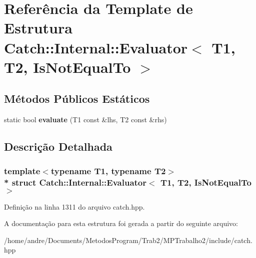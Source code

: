 \hypertarget{structCatch_1_1Internal_1_1Evaluator_3_01T1_00_01T2_00_01IsNotEqualTo_01_4}{}\section{Referência da Template de Estrutura Catch\+:\+:Internal\+:\+:Evaluator$<$ T1, T2, Is\+Not\+Equal\+To $>$}
\label{structCatch_1_1Internal_1_1Evaluator_3_01T1_00_01T2_00_01IsNotEqualTo_01_4}
\subsection*{Métodos Públicos Estáticos}
\begin{DoxyCompactItemize}
\item 
static bool {\bfseries evaluate} (T1 const \&lhs, T2 const \&rhs)\hypertarget{structCatch_1_1Internal_1_1Evaluator_3_01T1_00_01T2_00_01IsNotEqualTo_01_4_a956a12d0f4a7dceb5a1ce914421ff945}{}\label{structCatch_1_1Internal_1_1Evaluator_3_01T1_00_01T2_00_01IsNotEqualTo_01_4_a956a12d0f4a7dceb5a1ce914421ff945}

\end{DoxyCompactItemize}


\subsection{Descrição Detalhada}
\subsubsection*{template$<$typename T1, typename T2$>$\\*
struct Catch\+::\+Internal\+::\+Evaluator$<$ T1, T2, Is\+Not\+Equal\+To $>$}



Definição na linha 1311 do arquivo catch.\+hpp.



A documentação para esta estrutura foi gerada a partir do seguinte arquivo\+:\begin{DoxyCompactItemize}
\item 
/home/andre/\+Documents/\+Metodos\+Program/\+Trab2/\+M\+P\+Trabalho2/include/catch.\+hpp\end{DoxyCompactItemize}
